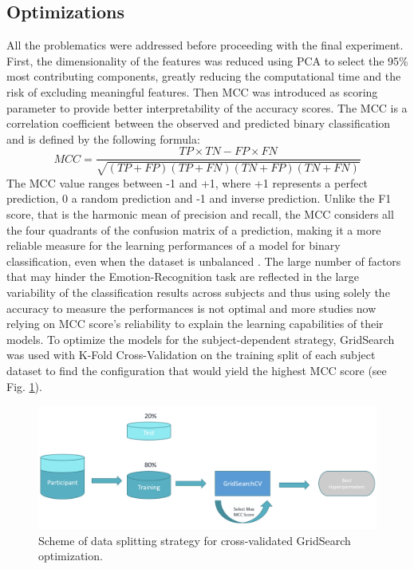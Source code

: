 \subsection{Optimizations}
\label{sec:optimizations}
All the problematics were addressed before proceeding with the final experiment. First, the dimensionality of the features was reduced using \ac{PCA} to select the 95\% most contributing components, greatly reducing the computational time and the risk of excluding meaningful features. Then \ac{MCC} \cite{matthews_comparison_1975} was introduced as scoring parameter to provide better interpretability of the accuracy scores. The \ac{MCC} is a correlation coefficient between the observed and predicted binary classification and is defined by the following formula: 
\[MCC = \frac{TP \times TN - FP  \times FN}{\sqrt{(TP + FP)(TP + FN)(TN+ FP)(TN + FN)}}\]
The \ac{MCC} value ranges between -1 and +1, where +1 represents a perfect prediction, 0 a random prediction and -1 and inverse prediction. Unlike the F1 score, that is the harmonic mean of precision and recall, the \ac{MCC} considers all the four quadrants of the confusion matrix of a prediction, making it a more reliable measure for the learning performances of a model for binary classification, even when the dataset is unbalanced \cite{chicco_advantages_2020}. The large number of factors that may hinder the Emotion-Recognition task are reflected in the large variability of the classification results across subjects and thus using solely the accuracy to measure the performances is not optimal and more studies \cite{thammasan_multimodal_2017, keelawat_comparative_2021} now relying on \ac{MCC} score’s reliability to explain the learning capabilities of their models. To optimize the models for the subject-dependent strategy, GridSearch was used with K-Fold Cross-Validation on the training split of each subject dataset to find the configuration that would yield the highest \ac{MCC} score (see Fig. \ref{fig_scheme_data_splitting}). 

\begin{figure}[h!]
\includegraphics[width=12cm]{img/methods/scheme_data_splitting.png}
\centering
\caption{Scheme of data splitting strategy for cross-validated GridSearch optimization.} \label{fig_scheme_data_splitting}
\end{figure}


